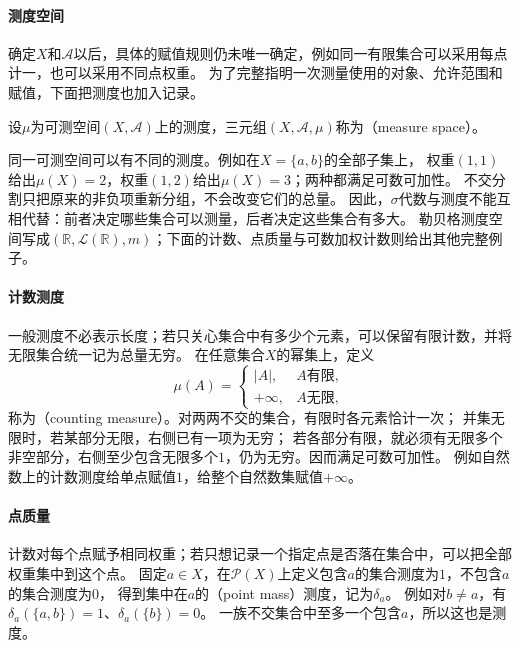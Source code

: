 \paragraph{测度空间}

确定$X$和$\mathcal A$以后，具体的赋值规则仍未唯一确定，例如同一有限集合可以采用每点计一，也可以采用不同点权重。
为了完整指明一次测量使用的对象、允许范围和赋值，下面把测度也加入记录。

\begin{definition}[测度空间]
\label{def:analysis-measure-space}
设$\mu$为可测空间$(X,\mathcal A)$上的测度，三元组$(X,\mathcal A,\mu)$称为（measure space）。
\end{definition}
同一可测空间可以有不同的测度。例如在$X=\{a,b\}$的全部子集上，
权重$(1,1)$给出$\mu(X)=2$，权重$(1,2)$给出$\mu(X)=3$；两种都满足可数可加性。
不交分割只把原来的非负项重新分组，不会改变它们的总量。
因此，$\sigma$代数与测度不能互相代替：前者决定哪些集合可以测量，后者决定这些集合有多大。
勒贝格测度空间写成$(\mathbb R,\mathcal L(\mathbb R),m)$；下面的计数、点质量与可数加权计数则给出其他完整例子。

\paragraph{计数测度}

一般测度不必表示长度；若只关心集合中有多少个元素，可以保留有限计数，并将无限集合统一记为总量无穷。
在任意集合$X$的幂集上，定义
\[
 \mu(A)=\begin{cases}|A|,&A\text{有限},\\+\infty,&A\text{无限},\end{cases}
\]
称为（counting measure）。对两两不交的集合，有限时各元素恰计一次；
并集无限时，若某部分无限，右侧已有一项为无穷；
若各部分有限，就必须有无限多个非空部分，右侧至少包含无限多个$1$，仍为无穷。因而满足可数可加性。
例如自然数上的计数测度给单点赋值$1$，给整个自然数集赋值$+\infty$。

\paragraph{点质量}

计数对每个点赋予相同权重；若只想记录一个指定点是否落在集合中，可以把全部权重集中到这个点。
固定$a\in X$，在$\mathcal P(X)$上定义包含$a$的集合测度为$1$，不包含$a$的集合测度为$0$，
得到集中在$a$的（point mass）测度，记为$\delta_a$。
例如对$b\neq a$，有$\delta_a(\{a,b\})=1$、$\delta_a(\{b\})=0$。
一族不交集合中至多一个包含$a$，所以这也是测度。


